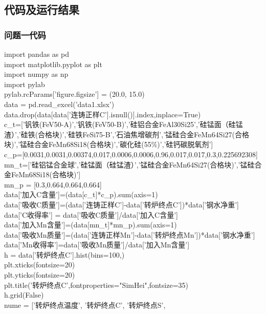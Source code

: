 \documentclass{xcumcmart}
\begin{document}
\subsection{代码及运行结果}
\subsubsection{问题一代码}
\noindent
import pandas as pd \\
import matplotlib.pyplot as plt \\
import numpy as np  \\
import pylab  \\
pylab.rcParams['figure.figsize'] = (20.0, 15.0)  \\
data = pd.read\_excel('data1.xlsx')  \\
data.drop(data[data['连铸正样C'].isnull()].index,inplace=True)  \\
c\_t=['钒铁(FeV50-A)','钒铁(FeV50-B)','硅铝合金FeAl30Si25','硅锰面（硅锰渣）','硅铁(合格块)','硅铁FeSi75-B','石油焦增碳剂','锰硅合金FeMn64Si27(合格块)','锰硅合金FeMn68Si18(合格块)','碳化硅(55\%)','硅钙碳脱氧剂']  \\
c\_p=[0.0031,0.0031,0.00374,0.017,0.0006,0.0006,0.96,0.017,0.017,0.3,0.225692308]  \\
mn\_t=['硅铝锰合金球','硅锰面（硅锰渣）','锰硅合金FeMn64Si27(合格块)','锰硅合金FeMn68Si18(合格块)']  \\
mn\_p = [0.3,0.664,0.664,0.664]  \\
data['加入C含量']=(data[c\_t]*c\_p).sum(axis=1)  \\
data['吸收C质量']=(data['连铸正样C']-data['转炉终点C'])*data['钢水净重']  \\
data['C收得率'] = data['吸收C质量']/data['加入C含量']  \\
data['加入Mn含量']=(data[mn\_t]*mn\_p).sum(axis=1)  \\
data['吸收Mn质量']=(data['连铸正样Mn']-data['转炉终点Mn'])*data['钢水净重']  \\
data['Mn收得率']=data['吸收Mn质量']/data['加入Mn含量']  \\
h = data['转炉终点C'].hist(bins=100,)  \\
plt.xticks(fontsize=20)  \\
plt.yticks(fontsize=20)  \\
plt.title('转炉终点C',fontproperties="SimHei",fontsize=35)  \\
h.grid(False)  \\
nume = ['转炉终点温度', '转炉终点C', '转炉终点S',  \\
\end{document}
